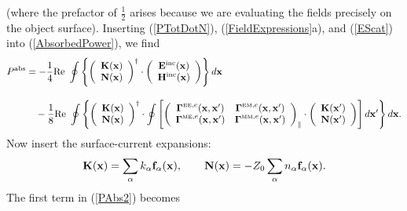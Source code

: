 \documentclass[letterpaper]{article}
\begin{document}
(where the prefactor of $\frac{1}{2}$ arises because we are evaluating
the fields precisely on the object surface). Inserting (\ref{PTotDotN}),
(\ref{FieldExpressions}a), and (\ref{EScat}) into (\ref{AbsorbedPower}), 
we find
\begin{align}
 P^{\hbox{\scriptsize{abs}}}
&=-\frac{1}{4}\text{Re }\oint \left\{
 \left(\begin{array}{c} 
       \mathbf{K}(\mathbf{x})  \\ \mathbf{N}(\mathbf{x}) 
       \end{array}
 \right)^\dagger
 \cdot 
 \left(\begin{array}{c} 
       \mathbf{E}^{\hbox{\scriptsize{inc}}}(\mathbf{x})  \\ \mathbf{H}^{\hbox{\scriptsize{inc}}}(\mathbf{x}) 
       \end{array}
 \right)\right\}d\mathbf{x}
\label{PAbs2}
\\[10pt]
&\quad -\frac{1}{8}\text{Re }\oint \left\{
 \left( \begin{array}{c} 
        \mathbf{K}(\mathbf{x})  \\ \mathbf{N}(\mathbf{x}) 
        \end{array}
 \right)^\dagger
 \cdot 
 \oint\left[
 \left(\begin{array}{cc} 
        \boldsymbol{\Gamma}^{\hbox{\tiny{EE}\scriptsize{,$e$}}}(\mathbf{x}, \mathbf{x}^\prime) &
        \boldsymbol{\Gamma}^{\hbox{\tiny{EM}\scriptsize{,$e$}}}(\mathbf{x}, \mathbf{x}^\prime) \\
        \boldsymbol{\Gamma}^{\hbox{\tiny{ME}\scriptsize{,$e$}}}(\mathbf{x}, \mathbf{x}^\prime) &
        \boldsymbol{\Gamma}^{\hbox{\tiny{MM}\scriptsize{,$e$}}}(\mathbf{x}, \mathbf{x}^\prime)
 \end{array}\right)_{\parallel}
 \cdot
 \left( \begin{array}{c} 
        \mathbf{K}(\mathbf{x}^\prime)  \\ \mathbf{N}(\mathbf{x}^\prime) 
        \end{array}
 \right)\right]d\mathbf{x}^\prime
 \right\}d\mathbf{x}.
\nonumber
\end{align}
Now insert the surface-current expansions:
$$\mathbf{K}(\mathbf{x})=\sum_\alpha k_\alpha \mathbf{f}_\alpha(\mathbf{x}), \qquad
 \mathbf{N}(\mathbf{x})=-Z_0\sum_\alpha n_\alpha \mathbf{f}_\alpha(\mathbf{x}).
$$
The first term in (\ref{PAbs2}) becomes
\end{document}

